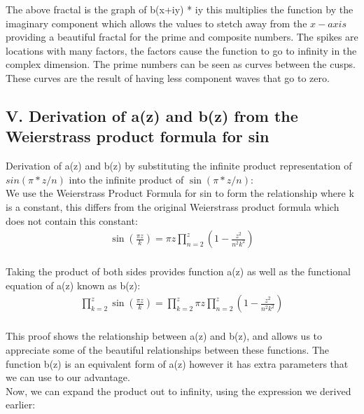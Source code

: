 \documentclass{article}
\begin{document}
The above fractal is the graph of b(x+iy) * iy this multiplies the function by the imaginary component which allows the values to stetch away from the $x-axis$ providing a beautiful fractal for the prime and composite numbers. The spikes are locations with many factors, the factors cause the function to go to infinity in the complex dimension. The prime numbers can be seen as curves between the cusps. These curves are the result of having less component waves that go to zero. \\

\newpage
\subsection*{V. Derivation of a(z) and b(z) from the Weierstrass product formula for sin}
Derivation of a(z) and b(z) by substituting the infinite product representation of $sin(\pi*z/n)$ into the infinite product of $\sin(\pi*z/n)$: \\

We use the Weierstrass Product Formula for sin to form the relationship where k is a constant, this differs from the original Weierstrass product formula which does not contain this constant: \\
\begin{align*}
	\sin\left(\frac{\pi z}{k}\right) = \pi z\prod_{n=2}^z \left(1-\frac{z^2}{n^2k^2}\right) \\
\end{align*}

Taking the product of both sides provides function a(z) as well as the functional equation of a(z) known as b(z): \\
\begin{align*}
	\prod_{k=2}^z\sin\left(\frac{\pi z}{k}\right) = \prod_{k=2}^z \pi z\prod_{n=2}^z \left(1-\frac{z^2}{n^2k^2}\right) \\
\end{align*}

This proof shows the relationship between a(z) and b(z), and allows us to appreciate some of the beautiful relationships between these functions. The function b(z) is an equivalent form of a(z) however it has extra parameters that we can use to our advantage. \\

Now, we can expand the product out to infinity, using the expression we derived earlier:
\end{document}
